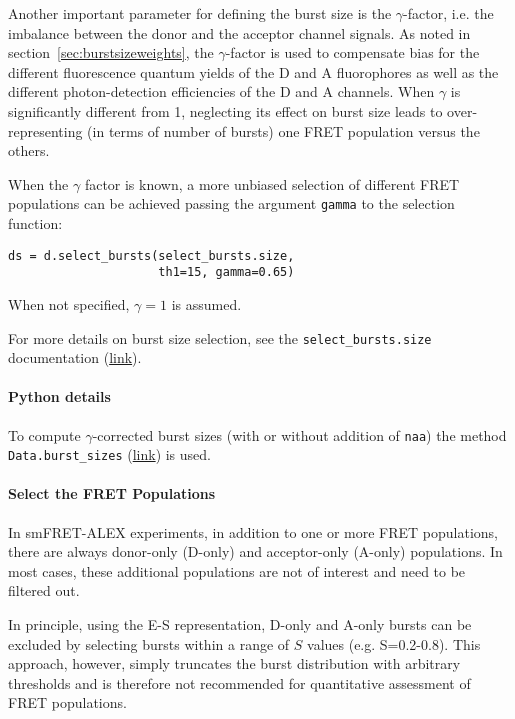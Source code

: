 
Another important parameter for defining the burst size is the $\gamma$-factor, i.e.
the imbalance between the donor and the acceptor channel signals. As noted in
section~\ref{sec:burstsizeweights}, the $\gamma$-factor is
used to compensate bias for the different fluorescence quantum yields of the D and A
fluorophores as well as the different photon-detection efficiencies of the D and A channels.
When $\gamma$ is significantly different from 1, neglecting its effect on burst size leads to
over-representing (in terms of number of bursts) one FRET population versus the others.

When the $\gamma$ factor is known, a more unbiased selection of different FRET
populations can be achieved passing the argument \verb|gamma| to the 
selection function:

\begin{lstlisting}
ds = d.select_bursts(select_bursts.size,
                     th1=15, gamma=0.65)
\end{lstlisting}

When not specified, $\gamma=1$ is assumed.

For more details on burst size selection, see the
\verb|select_bursts.size| documentation
(\href{http://fretbursts.readthedocs.org/en/latest/burst_selection.html#fretbursts.select_bursts.size}{link}).

\paragraph{Python details} 
To compute $\gamma$-corrected burst sizes (with or without addition of \verb|naa|) 
the method \verb|Data.burst_sizes|
(\href{http://fretbursts.readthedocs.org/en/latest/data_class.html#fretbursts.burstlib.Data.burst_sizes}{link})
is used.

\paragraph{Select the FRET Populations}

In smFRET-ALEX experiments, in addition to one or more FRET populations, there are always
donor-only (D-only) and acceptor-only (A-only) populations.
In most cases, these additional populations are not of interest and need to be filtered out.

In principle, using the E-S representation, D-only and A-only bursts
can be excluded by selecting bursts within a range of $S$ values (e.g. S=0.2-0.8). 
This approach, however, simply truncates the burst distribution with arbitrary
thresholds and is therefore not recommended for quantitative assessment of FRET
populations.

